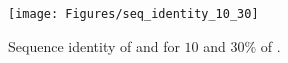 \begin{figure}[ht!]
  \centering
  \texttt{[image: Figures/seq\_identity\_10\_30]}
  \caption{Sequence identity of \ourprog and \RNAinverse for $10$ and $30\%$ of \GC.}
  \label{fig:benchmark_RNASSD}
\end{figure}










